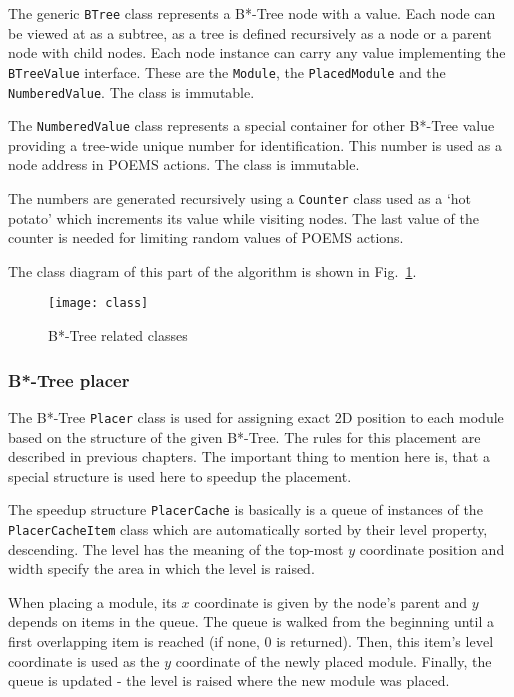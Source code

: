 The generic {\tt BTree} class represents a B*-Tree node with a value. Each node can be viewed at as a subtree, as a tree is defined recursively as a node or a parent node with child nodes. Each node instance can carry any value implementing the {\tt BTreeValue} interface. These are the {\tt Module}, the {\tt PlacedModule} and the {\tt NumberedValue}. The class is immutable.

The {\tt NumberedValue} class represents a special container for other B*-Tree value providing a tree-wide unique number for identification. This number is used as a node address in POEMS actions. The class is immutable.

The numbers are generated recursively using a {\tt Counter} class used as a `hot potato' which increments its value while visiting nodes. The last value of the counter is needed for limiting random values of POEMS actions.

The class diagram of this part of the algorithm is shown in Fig.~\ref{fig:uml:btree}.

\begin{figure}
\centering
\texttt{[image: class]}
\caption{B*-Tree related classes}
\label{fig:uml:btree}
\end{figure}

\subsubsection{B*-Tree placer}

The B*-Tree {\tt Placer} class is used for assigning exact 2D position to each module based on the structure of the given B*-Tree. The rules for this placement are described in previous chapters. The important thing to mention here is, that a special structure is used here to speedup the placement. 

The speedup structure {\tt PlacerCache} is basically is a queue of instances of the {\tt PlacerCacheItem} class which are automatically sorted by their $\mathrm{level}$ property, descending. The $\mathrm{level}$ has the meaning of the top-most $y$ coordinate $\mathrm{position}$ and $\mathrm{width}$ specify the area in which the level is raised.

When placing a module, its $x$ coordinate is given by the node's parent and $y$ depends on items in the queue. The queue is walked from the beginning until a first overlapping item is reached (if none, $0$ is returned). Then, this item's $\mathrm{level}$ coordinate is used as the $y$ coordinate of the newly placed module. Finally, the queue is updated - the level is raised where the new module was placed.

